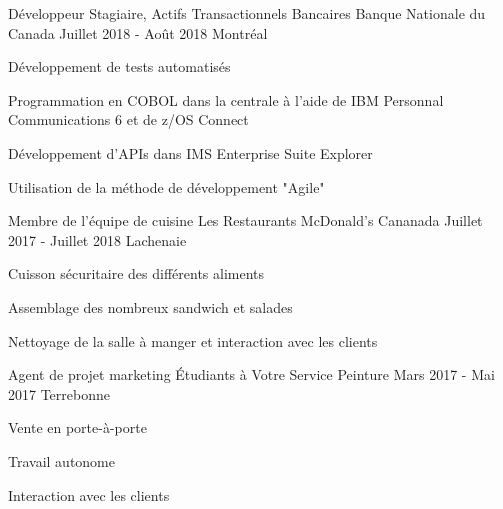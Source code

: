 \begin{cventries}
  \cventry
    {Développeur Stagiaire, Actifs Transactionnels Bancaires}
    {Banque Nationale du Canada}
    {Juillet 2018 - Août 2018}
    {Montréal}
    {
      \begin{cvitems}
      \item{Développement de tests automatisés}
        \item {Programmation en COBOL dans la centrale à l'aide de IBM Personnal Communications 6 et de z/OS Connect}
        \item {Développement d'APIs dans IMS Enterprise Suite Explorer}
        \item {Utilisation de la méthode de développement "Agile"}
      \end{cvitems}
    }
  \cventry
    {Membre de l'équipe de cuisine}
    {Les Restaurants McDonald's Cananada}
    {Juillet 2017 - Juillet 2018}
    {Lachenaie}
    {
      \begin{cvitems}
        \item {Cuisson sécuritaire des différents aliments}
        \item {Assemblage des nombreux sandwich et salades}
        \item {Nettoyage de la salle à manger et interaction avec les clients} 
      \end{cvitems}
    }
  \cventry
    {Agent de projet marketing}
    {Étudiants à Votre Service Peinture}
    {Mars 2017 - Mai 2017}
    {Terrebonne}
    {
      \begin{cvitems}
        \item {Vente en porte-à-porte}
        \item {Travail autonome}
        \item {Interaction avec les clients}
      \end{cvitems} 
    }
\end{cventries}

